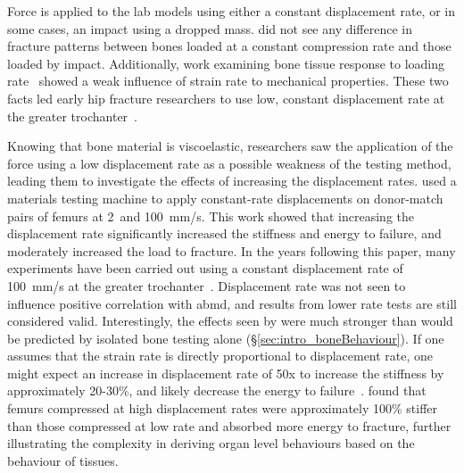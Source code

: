 Force is applied to the lab models using either a constant displacement rate, or in some cases, an impact using a dropped mass.
 did not see any difference in fracture patterns between bones loaded at a constant compression rate and those loaded by impact.
Additionally, work examining bone tissue response to loading rate~\citep{carter_bone_1976, currey_effects_1975} showed a weak influence of strain rate to mechanical properties.
These two facts led early hip fracture researchers to use low, constant displacement rate at the greater trochanter~\citep{lotz_use_1990}.

Knowing that bone material is viscoelastic, researchers saw the application of the force using a low displacement rate as a possible weakness of the testing method, leading them to investigate the effects of increasing the displacement rates.
 used a materials testing machine to apply constant-rate displacements on donor-match pairs of femurs at 2~and 100~\ac{mm}/\ac{s}.
This work showed that increasing the displacement rate significantly increased the stiffness and energy to failure, and moderately increased the load to fracture.
In the years following this paper, many experiments have been carried out using a constant displacement rate of 100~\ac{mm}/\ac{s} at the greater trochanter~\citep{de_bakker_during_2009, manske_cortical_2008, manske_femoral_2006, sutter_biomechanical_2010}.
Displacement rate was not seen to influence positive correlation with \ac{abmd}, and results from lower rate tests are still considered valid.
Interestingly, the effects seen by \citet{courtney_effects_1994} were much stronger than would be predicted by isolated bone testing alone (\S\ref{sec:intro_boneBehaviour}).
If one assumes that the strain rate is directly proportional to displacement rate, one might expect an increase in displacement rate of 50x to increase the stiffness by approximately 20-30\%, and likely decrease the energy to failure~\citep{mcelhaney_dynamic_1966, carter_compressive_1977, linde_mechanical_1991}.
 found that femurs compressed at high displacement rates were approximately 100\% stiffer than those compressed at low rate and absorbed more energy to fracture, further illustrating the complexity in deriving organ level behaviours based on the behaviour of tissues.

